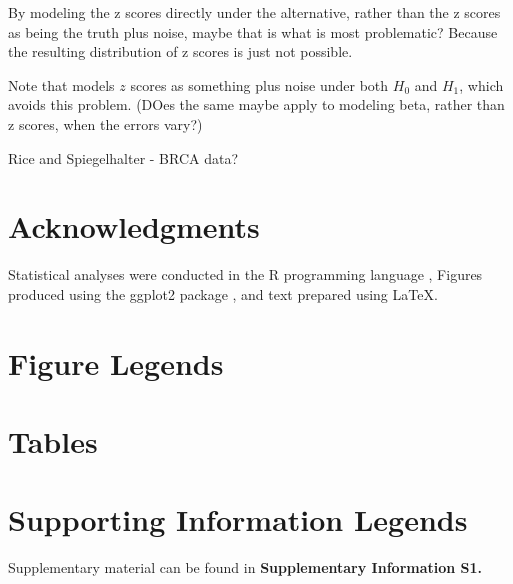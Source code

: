 \documentclass[10pt]{article}
\begin{document}
By modeling the z scores directly under the alternative, rather than the z scores as being the truth plus noise,
maybe that is what is most problematic? Because the resulting distribution of z scores is just not possible.

Note that \cite{muralidharan:2012} models $z$ scores as something plus noise under both $H_0$ and $H_1$, which
avoids this problem. (DOes the same maybe apply to modeling beta, rather than z scores, when the errors vary?)

Rice and Spiegelhalter - BRCA data?


\section*{Acknowledgments}

Statistical analyses were conducted in the {\sf R} programming language \cite{Rcore:2012}, Figures produced using the ggplot2 package \cite{ggplot2}, and text
prepared using \LaTeX.



\section*{Figure Legends}


\clearpage

\section*{Tables}

\section*{Supporting Information Legends}

Supplementary material can be found in {\bf Supplementary Information S1.}
\end{document}
